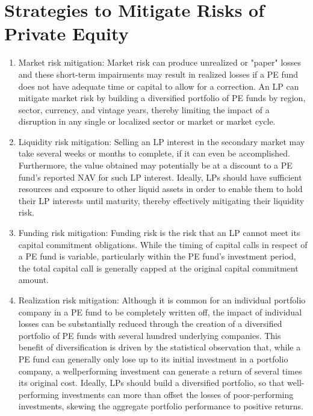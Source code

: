 \documentclass[11pt]{article}
\begin{document}
\section*{Strategies to Mitigate Risks of Private Equity}
\begin{enumerate}
  \item Market risk mitigation: Market risk can produce unrealized or "paper" losses and these short-term impairments may result in realized losses if a PE fund does not have adequate time or capital to allow for a correction. An LP can mitigate market risk by building a diversified portfolio of PE funds by region, sector, currency, and vintage years, thereby limiting the impact of a disruption in any single or localized sector or market or market cycle.

  \item Liquidity risk mitigation: Selling an LP interest in the secondary market may take several weeks or months to complete, if it can even be accomplished. Furthermore, the value obtained may potentially be at a discount to a PE fund's reported NAV for such LP interest. Ideally, LPs should have sufficient resources and exposure to other liquid assets in order to enable them to hold their LP interests until maturity, thereby effectively mitigating their liquidity risk.

  \item Funding risk mitigation: Funding risk is the risk that an LP cannot meet its capital commitment obligations. While the timing of capital calls in respect of a PE fund is variable, particularly within the PE fund's investment period, the total capital call is generally capped at the original capital commitment amount.

  \item Realization risk mitigation: Although it is common for an individual portfolio company in a PE fund to be completely written off, the impact of individual losses can be substantially reduced through the creation of a diversified portfolio of PE funds with several hundred underlying companies. This benefit of diversification is driven by the statistical observation that, while a PE fund can generally only lose up to its initial investment in a portfolio company, a wellperforming investment can generate a return of several times its original cost. Ideally, LPs should build a diversified portfolio, so that well-performing investments can more than offset the losses of poor-performing investments, skewing the aggregate portfolio performance to positive returns.

\end{enumerate}
\end{document}

